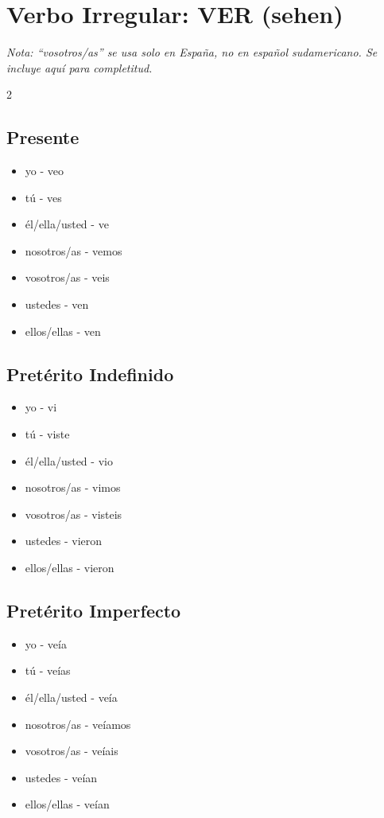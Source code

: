 \documentclass[12pt,a4paper]{article}
\begin{document}
\newpage

\section*{Verbo Irregular: VER (sehen)}

\textit{Nota: \enquote{vosotros/as} se usa solo en España, no en español sudamericano. Se incluye aquí para completitud.}

\begin{multicols}{2}

\subsection*{Presente}
\begin{itemize}[leftmargin=*]
    \item yo - veo
    \item tú - ves
    \item él/ella/usted - ve
    \item nosotros/as - vemos
    \item vosotros/as - veis
    \item ustedes - ven
    \item ellos/ellas - ven
\end{itemize}

\subsection*{Pretérito Indefinido}
\begin{itemize}[leftmargin=*]
    \item yo - vi
    \item tú - viste
    \item él/ella/usted - vio
    \item nosotros/as - vimos
    \item vosotros/as - visteis
    \item ustedes - vieron
    \item ellos/ellas - vieron
\end{itemize}

\subsection*{Pretérito Imperfecto}
\begin{itemize}[leftmargin=*]
    \item yo - veía
    \item tú - veías
    \item él/ella/usted - veía
    \item nosotros/as - veíamos
    \item vosotros/as - veíais
    \item ustedes - veían
    \item ellos/ellas - veían
\end{itemize}


\end{multicols}
\end{document}
